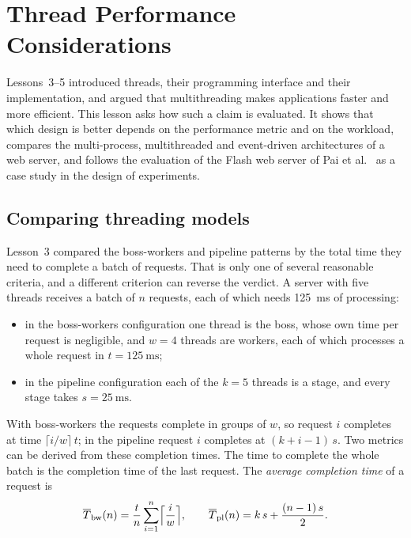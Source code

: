 \documentclass[../main.tex]{subfiles}
\begin{document}
\chapter{Thread Performance Considerations}

Lessons~3--5 introduced threads, their programming interface and their
implementation, and argued that multithreading makes applications faster
and more efficient.  This lesson asks how such a claim is evaluated.  It
shows that which design is better depends on the performance metric and on
the workload, compares the multi-process, multithreaded and event-driven
architectures of a web server, and follows the evaluation of the Flash web
server of Pai et al.\ \cite{pai1999} as a case study in the design of
experiments.

\section{Comparing threading models}
\label{sec:l06-compare}

Lesson~3 compared the boss-workers and pipeline patterns by the total time
they need to complete a batch of requests.  That is only one of several
reasonable criteria, and a different criterion can reverse the
verdict.  A server with
five threads receives a batch of $n$ requests, each of which needs
\SI{125}{\milli\second} of processing:
\begin{itemize}
  \item in the boss-workers configuration one thread is the boss, whose own
    time per request is negligible, and $w = 4$ threads are workers, each of
    which processes a whole request in $t = \SI{125}{\milli\second}$;
  \item in the pipeline configuration each of the $k = 5$ threads is a
    stage, and every stage takes $s = \SI{25}{\milli\second}$.
\end{itemize}
With boss-workers the requests complete in groups of $w$, so request $i$
completes at time $\lceil i/w \rceil\, t$; in the pipeline request $i$
completes at $(k + i - 1)\, s$.  Two metrics can be derived from these
completion times.  The time to
complete the whole batch is the completion time of the last request.  The
\emph{average completion time} of a request is
\begin{equation}
  \overline{T}_{\mathrm{bw}}(n) = \frac{t}{n} \sum_{i=1}^{n}
    \Bigl\lceil \frac{i}{w} \Bigr\rceil ,
  \qquad
  \overline{T}_{\mathrm{pl}}(n) = k\, s + \frac{(n-1)\, s}{2} .
  \label{eq:l06-mean-completion}
\end{equation}
\end{document}
